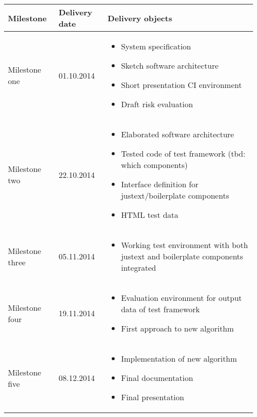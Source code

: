     \begin{tabular}{ | p{2.5cm} | p{2.5cm} | p{9cm} |}
    \hline
    \textbf{Milestone} & \textbf{Delivery date} & \textbf{Delivery objects}\\ \hline
    Milestone one & 01.10.2014 &
        \begin{itemize}
        \item System specification
        \item Sketch software architecture
        \item Short presentation CI environment
        \item Draft risk evaluation
        \end{itemize}\\
    \hline
        Milestone two & 22.10.2014 &
        \begin{itemize}
        \item Elaborated software architecture
        \item Tested code of test framework (tbd: which components)
        \item Interface definition for justext/boilerplate components
        \item HTML test data
        \end{itemize}\\
    \hline
        Milestone three & 05.11.2014 &
        \begin{itemize}
        \item Working test environment with both justext and boilerplate components integrated
        \end{itemize}\\
    \hline
        Milestone four & 19.11.2014 &
        \begin{itemize}
        \item Evaluation environment for output data of test framework
        \item First approach to new algorithm
        \end{itemize}\\
    \hline
        Milestone five & 08.12.2014 &
        \begin{itemize}
        \item Implementation of new algorithm
        \item Final documentation
        \item Final presentation
        \end{itemize}\\
    \hline
    \end{tabular}


